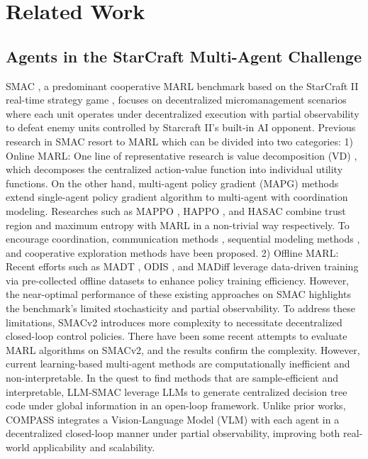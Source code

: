 \section{Related Work}
\label{related work}
\subsection{Agents in the StarCraft Multi-Agent Challenge}
SMAC \cite{10.5555/3306127.3332052}, a predominant cooperative MARL benchmark based on the StarCraft II real-time strategy game \cite{vinyals2017starcraftiinewchallenge}, focuses on decentralized micromanagement scenarios where each unit operates under decentralized execution with partial observability to defeat enemy units controlled by Starcraft II’s built-in AI opponent. Previous research in SMAC resort to MARL which can be divided into two categories: 1) Online MARL: One line of representative research is value decomposition (VD) \cite{JMLR:v21:20-081,wang2021qplex,pmlr-v97-son19a}, which decomposes the centralized action-value function into individual utility functions. On the other hand, multi-agent policy gradient (MAPG) methods \cite{NEURIPS2022_9c1535a0,kuba2022trustregionpolicyoptimisation,liu2024maximum,Li_Liu_Zhang_Wei_Niu_Yang_Liu_Ouyang_2023,NEURIPS2022_69413f87,hu2024learning,na2024efficient} extend single-agent policy gradient algorithm to multi-agent with coordination modeling. Researches such as MAPPO \cite{NEURIPS2022_9c1535a0}, HAPPO \cite{kuba2022trustregionpolicyoptimisation}, and HASAC \cite{liu2024maximum} combine trust region and maximum entropy with MARL in a non-trivial way respectively. To encourage coordination, communication methods \cite{hu2024learning,lo2024learning}, sequential modeling methods \cite{Li_Liu_Zhang_Wei_Niu_Yang_Liu_Ouyang_2023,NEURIPS2022_69413f87}, and cooperative exploration methods \cite{10.5555/3454287.3454971,na2024efficient} have been proposed. 2) Offline MARL: Recent efforts such as MADT \cite{meng2023offline}, ODIS \cite{zhang2022discovering}, and MADiff \cite{zhu2025madiffofflinemultiagentlearning} leverage data-driven training via pre-collected offline datasets to enhance policy training efficiency. However, the near-optimal performance of these existing approaches on SMAC highlights the benchmark's limited stochasticity and partial observability. To address these limitations, SMACv2 \cite{10.5555/3666122.3667756} introduces more complexity to necessitate decentralized closed-loop control policies. There have been some recent attempts \cite{Li_Zhao_Wu_Pajarinen_2024,mcclellan2024boostingsampleefficiencygeneralization,10.5555/3545946.3598961,li2024agentmixermultiagentcorrelatedpolicy} to evaluate MARL algorithms on SMACv2, and the results confirm the complexity. However, current learning-based multi-agent methods are computationally inefficient and non-interpretable. In the quest to find methods that are sample-efficient and interpretable, LLM-SMAC \cite{deng2024newapproachsolvingsmac} leverage LLMs to generate centralized decision tree code under global information in an open-loop framework. Unlike prior works, COMPASS integrates a Vision-Language Model (VLM) with each agent in a decentralized closed-loop manner under partial observability, improving both real-world applicability and scalability.

